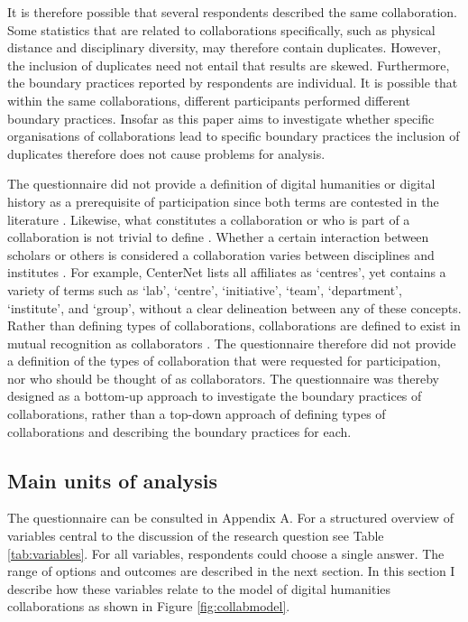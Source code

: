 \documentclass{article}
\begin{document}
It is therefore possible that several respondents described the same collaboration.
Some statistics that are related to collaborations specifically, such as physical distance and disciplinary diversity, may therefore contain duplicates. However, the inclusion of duplicates need not entail that results are skewed.
Furthermore, the boundary practices reported by respondents are individual. It is possible that within the same collaborations, different participants performed different boundary practices. 
Insofar as this paper aims to investigate whether specific organisations of collaborations lead to specific boundary practices the inclusion of duplicates therefore does not cause problems for analysis.

The questionnaire did not provide a definition of digital humanities or digital history as a prerequisite of participation since both terms are contested in the literature \citep[see e.g.,][]{Antonijevic2015,Robertson2016,Terras2013}.
Likewise, what constitutes a collaboration or who is part of a collaboration is not trivial to define \citep{Katz1997}. 
Whether a certain interaction between scholars or others is considered a collaboration varies between disciplines and institutes \citep{Burroughs2017}. 
For example, CenterNet lists all affiliates as `centres', yet contains a variety of terms such as `lab', `centre', `initiative', `team', `department', `institute', and `group', without a clear delineation between any of these concepts.
Rather than defining types of collaborations, collaborations are defined to exist in mutual recognition as collaborators \citep[p. 56]{wenger1998}.
The questionnaire therefore did not provide a definition of the types of collaboration that were requested for participation, nor who should be thought of as collaborators. 
The questionnaire was thereby designed as a bottom-up approach to investigate the boundary practices of collaborations, rather than a top-down approach of defining types of collaborations and describing the boundary practices for each. 

\subsection{Main units of analysis}
The questionnaire can be consulted in Appendix A. For a structured overview of variables central to the discussion of the research question see Table \ref{tab:variables}. For all variables, respondents could choose a single answer. The range of options and outcomes are described in the next section. 
In this section I describe how these variables relate to the model of digital humanities collaborations as shown in Figure \ref{fig:collabmodel}.
\end{document}
